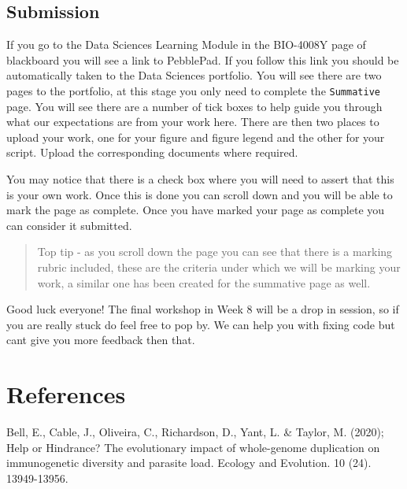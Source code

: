 \documentclass[
]{book}
\begin{document}
\hypertarget{submission}{%
\subsection{Submission}\label{submission}}

If you go to the Data Sciences Learning Module in the BIO-4008Y page of blackboard you will see a link to PebblePad. If you follow this link you should be automatically taken to the Data Sciences portfolio. You will see there are two pages to the portfolio, at this stage you only need to complete the \texttt{Summative} page. You will see there are a number of tick boxes to help guide you through what our expectations are from your work here. There are then two places to upload your work, one for your figure and figure legend and the other for your script. Upload the corresponding documents where required.

You may notice that there is a check box where you will need to assert that this is your own work. Once this is done you can scroll down and you will be able to mark the page as complete. Once you have marked your page as complete you can consider it submitted.

\begin{quote}
Top tip - as you scroll down the page you can see that there is a marking rubric included, these are the criteria under which we will be marking your work, a similar one has been created for the summative page as well.
\end{quote}

Good luck everyone! The final workshop in Week 8 will be a drop in session, so if you are really stuck do feel free to pop by. We can help you with fixing code but cant give you more feedback then that.

\hypertarget{references-11}{%
\section{References}\label{references-11}}

Bell, E., Cable, J., Oliveira, C., Richardson, D., Yant, L. \& Taylor, M. (2020); Help or Hindrance? The evolutionary impact of whole-genome duplication on immunogenetic diversity and parasite load. Ecology and Evolution. 10 (24). 13949-13956.
\end{document}
